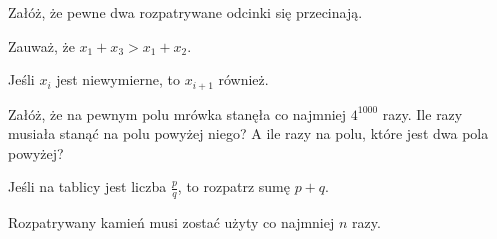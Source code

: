 
\begin{hints_list}
	\item Załóż, że pewne dwa rozpatrywane odcinki się przecinają.
	\item Zauważ, że $x_1 + x_3 > x_1 + x_2.$
	\item Jeśli $x_i$ jest niewymierne, to $x_{i + 1}$ również.
	\item Załóż, że na pewnym polu mrówka stanęła co najmniej $4^{1000}$ razy. Ile razy musiała stanąć na polu powyżej niego? A ile razy na polu, które jest dwa pola powyżej?
	\item Jeśli na tablicy jest liczba $\frac{p}{q}$, to rozpatrz sumę $p + q$.
	\item Rozpatrywany kamień musi zostać użyty co najmniej $n$ razy.
\end{hints_list}